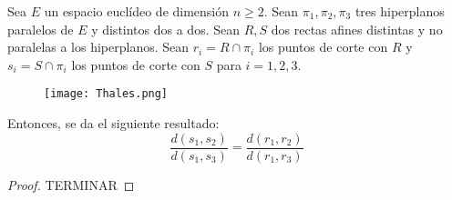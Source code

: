 \begin{teo}[de Thales]
    Sea $E$ un espacio euclídeo de dimensión $n\geq 2$. Sean $\pi_1,\pi_2,\pi_3$ tres hiperplanos paralelos de $E$ y distintos dos a dos. Sean $R,S$ dos rectas afines distintas y no paralelas a los hiperplanos. Sean $r_i=R\cap \pi_i$ los puntos de corte con $R$ y $s_i=S\cap \pi_i$ los puntos de corte con $S$ para $i=1,2,3$.
    \begin{comment}
\begin{center}
\begin{tikzpicture}
  \begin{axis}[
    width=10cm,
    height=10cm,
    axis lines = middle,
    view={135}{15},
    xlabel={$x$},
    ylabel={$y$},
    zlabel={$z$},
  ]

  \addplot3[domain=0:1, samples=2, color=black, thick] ({3 - 2*x}, {-3 + 2*x}, {6 - 12*x});

\addplot3[domain=0:1, samples=2, color=black, thick] ({-4 + 4*x}, 2, {6 - 12*x});

  \addplot3[opacity=0.6, surf, color=blue, domain=-5:5, domain y=-5:5] {-5};

  \addplot3[opacity=0.6, surf, color=green, domain=-5:5, domain y=-5:5] {0};

  \addplot3[opacity=0.6, surf, color=red, domain=-5:5, domain y=-5:5] {5};

\node[circle, draw, inner sep=1pt, fill=white] at (axis cs:3,-3,6) [label={-135:$P$}] {};

\node[circle, draw, inner sep=1pt, fill=white] at (axis cs:1,-1,-6) [label={-135:$Q$}] {};



  \end{axis}
\end{tikzpicture}
\end{center}
\end{comment}
    \begin{figure}[H]
        \centering
    \texttt{[image: Thales.png]}
    \end{figure}

    Entonces, se da el siguiente resultado:
    \begin{equation*}
        \frac{d(s_1,s_2)}{d(s_1,s_3)} =
        \frac{d(r_1,r_2)}{d(r_1,r_3)}
    \end{equation*}
\end{teo}
\begin{proof}
    TERMINAR
\end{proof}


